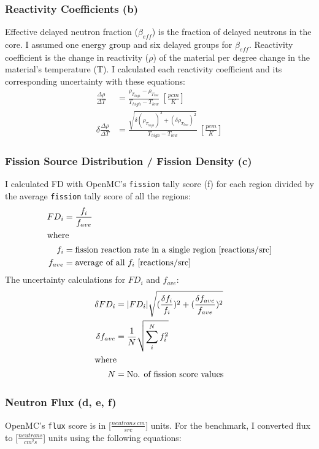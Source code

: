 \subsubsection{Reactivity Coefficients (b)}
Effective delayed neutron fraction ($\beta_{eff}$) is the fraction of delayed 
neutrons in the core. 
I assumed one energy group and six delayed groups for $\beta_{eff}$. 
Reactivity coefficient is the change in reactivity ($\rho$) of the material 
per degree change in the material's temperature (T). 
I calculated each reactivity coefficient and its corresponding uncertainty 
with these equations: 
\begin{align}
    \frac{\Delta \rho}{\Delta T} &= 
    \frac{\rho_{T_{high}}-\rho_{T_{low}}}{T_{high}-T_{low}} \ [\frac{pcm}{K}] \\
    \delta \frac{\Delta \rho}{\Delta T} &= 
    \frac{\sqrt{\delta (\rho_{T_{high}})^2+(\delta \rho_{T_{low}})^2}}{T_{high}-T_{low}} \ [\frac{pcm}{K}] 
\end{align}

\subsubsection{Fission Source Distribution / Fission Density (c)}
I calculated \gls{FD} with OpenMC's \texttt{fission} tally score (f) 
for each region divided by the average \texttt{fission} tally score of all the regions:
\begin{align}
    FD_i &=  \frac{f_i}{f_{ave}} \\
    \intertext{where}
    f_i &= \mbox{fission reaction rate in a single region [reactions/src]} \nonumber \\
    f_{ave} &= \mbox{average of all $f_i$ [reactions/src]} \nonumber
\end{align}
The uncertainty calculations for $FD_i$ and $f_{ave}$: 
\begin{align}
    \delta FD_i &= |FD_i| \sqrt{(\frac{\delta f_i}{f_i})^2+(\frac{\delta f_{ave}}{f_{ave}})^2} \\
    \delta f_{ave} &= \frac{1}{N}\sqrt{\sum_i^Nf_i^2} \\
    \intertext{where}
    N &= \mbox{No. of fission score values} \nonumber
\end{align}

\subsubsection{Neutron Flux (d, e, f)}
OpenMC's \texttt{flux} score is in [$\frac{neutrons\ cm}{src}$] units. 
For the benchmark, I converted flux to [$\frac{neutrons}{cm^2s}$] units
using the following equations:  

